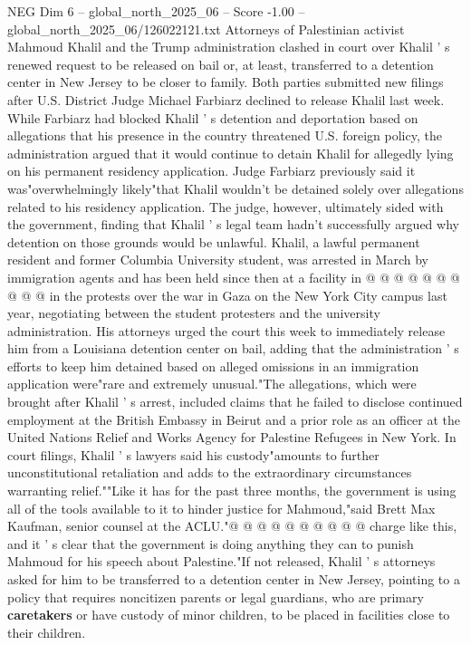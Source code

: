 \begin{textsample}{NEG Dim 6 – global\_north\_2025\_06 – Score -1.00 – global\_north\_2025\_06/126022121.txt}  \label{ex:f6_neg_432}
Attorneys of Palestinian activist Mahmoud Khalil and the Trump administration clashed in court over Khalil ' s renewed request to be released on bail or, at least, transferred to a detention center in New Jersey to be closer to family.
Both parties submitted new filings after U.S.
District Judge Michael Farbiarz declined to release Khalil last week.
While Farbiarz had blocked Khalil ' s detention and deportation based on allegations that his presence in the country threatened U.S. foreign policy, the administration argued that it would continue to detain Khalil for allegedly lying on his permanent residency application.
Judge Farbiarz previously said it was"overwhelmingly likely"that Khalil wouldn't be detained solely over allegations related to his residency application.
The judge, however, ultimately sided with the government, finding that Khalil ' s legal team hadn't successfully argued why detention on those grounds would be unlawful.
Khalil, a lawful permanent resident and former Columbia University student, was arrested in March by immigration agents and has been held since then at a facility in @ @ @ @ @ @ @ @ @ @ in the protests over the war in Gaza on the New York City campus last year, negotiating between the student protesters and the university administration.
His attorneys urged the court this week to immediately release him from a Louisiana detention center on bail, adding that the administration ' s efforts to keep him detained based on alleged omissions in an immigration application were"rare and extremely unusual."The allegations, which were brought after Khalil ' s arrest, included claims that he failed to disclose continued employment at the British Embassy in Beirut and a prior role as an officer at the United Nations Relief and Works Agency for Palestine Refugees in New York.
In court filings, Khalil ' s lawyers said his custody"amounts to further unconstitutional retaliation and adds to the extraordinary circumstances warranting relief.""Like it has for the past three months, the government is using all of the tools available to it to hinder justice for Mahmoud,"said Brett Max Kaufman, senior counsel at the ACLU."@ @ @ @ @ @ @ @ @ @ charge like this, and it ' s clear that the government is doing anything they can to punish Mahmoud for his speech about Palestine."If not released, Khalil ' s attorneys asked for him to be transferred to a detention center in New Jersey, pointing to a policy that requires noncitizen parents or legal guardians, who are primary \textbf{caretakers} or have custody of minor children, to be placed in facilities close to their children.

\end{textsample}
